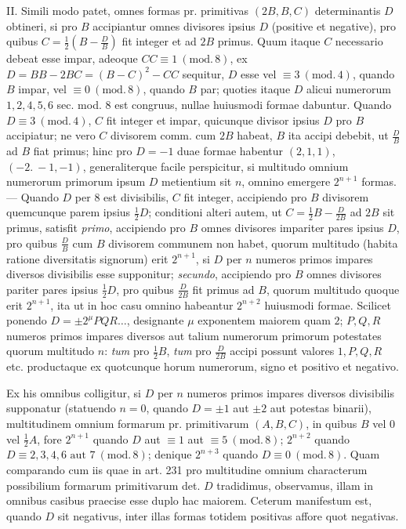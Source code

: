 II. Simili modo patet, omnes formas pr. primitivas \((2B,B,C)\) determinantis \(D\) obtineri, si pro \(B\) accipiantur omnes divisores ipsius \(D\) (positive et negative), pro quibus \(C=\frac12(B-\frac{D}{B})\) fit integer et ad \(2B\) primus. Quum itaque \(C\) necessario debeat esse impar, adeoque \(CC\equiv1\ (\mathrm{mod.}\,8)\), ex \(D=BB-2BC=(B-C)^2-CC\) sequitur, \(D\) esse vel \(\equiv3\ (\mathrm{mod.}\,4)\), quando \(B\) impar, vel \(\equiv0\ (\mathrm{mod.}\,8)\), quando \(B\) par; quoties itaque \(D\) alicui numerorum \(1,2,4,5,6\) sec. mod. \(8\) est congruus, nullae huiusmodi formae dabuntur. Quando \(D\equiv3\ (\mathrm{mod.}\,4)\), \(C\) fit integer et impar, quicunque divisor ipsius \(D\) pro \(B\) accipiatur; ne vero \(C\) divisorem comm. cum \(2B\) habeat, \(B\) ita accipi debebit, ut \(\frac{D}{B}\) ad \(B\) fiat primus; hinc pro \(D=-1\) duae formae habentur \((2,1,1)\), \((-2.\ -1,-1)\), generaliterque facile perspicitur, si multitudo omnium numerorum primorum ipsum \(D\) metientium sit \(n\), omnino emergere \(2^{n+1}\) formas. --- Quando \(D\) per \(8\) est divisibilis, \(C\) fit integer, accipiendo pro \(B\) divisorem quemcunque parem ipsius \(\frac12 D\); conditioni alteri autem, ut \(C=\frac12 B-\frac{D}{2B}\) ad \(2B\) sit primus, satisfit \textit{primo}, accipiendo pro \(B\) omnes divisores impariter pares ipsius \(D\), pro quibus \(\frac{D}{B}\) cum \(B\) divisorem communem non habet, quorum multitudo (habita ratione diversitatis signorum) erit \(2^{n+1}\), si \(D\) per \(n\) numeros primos impares diversos divisibilis esse supponitur; \textit{secundo}, accipiendo pro \(B\) omnes divisores pariter pares ipsius
\(\frac12 D\), pro quibus \(\frac{D}{2B}\) fit primus ad \(B\), quorum multitudo quoque erit \(2^{n+1}\), ita ut in hoc casu omnino habeantur \(2^{n+2}\) huiusmodi formae. Scilicet ponendo \(D=\pm2^\mu PQR\ldots\), designante \(\mu\) exponentem maiorem quam \(2\); \(P,Q,R\) numeros primos impares diversos aut talium numerorum primorum potestates quorum multitudo \(n\): \textit{tum} pro \(\frac12 B\), \textit{tum} pro \(\frac{D}{2B}\) accipi possunt valores \(1,P,Q,R\) etc. productaque ex quotcunque horum numerorum, signo et positivo et negativo.

Ex his omnibus colligitur, si \(D\) per \(n\) numeros primos impares diversos divisibilis supponatur (statuendo \(n=0\), quando \(D=\pm1\) aut \(\pm2\) aut potestas binarii), multitudinem omnium formarum pr. primitivarum \((A,B,C)\), in quibus \(B\) vel \(0\) vel \(\frac12 A\), fore \(2^{n+1}\) quando \(D\) aut \(\equiv1\) aut \(\equiv5\ (\mathrm{mod.}\,8)\); \(2^{n+2}\) quando \(D\equiv2,3,4,6\text{ aut }7\ (\mathrm{mod.}\,8)\); denique \(2^{n+3}\) quando \(D\equiv0\ (\mathrm{mod.}\,8)\). Quam comparando cum iis quae in art. 231 pro multitudine omnium characterum possibilium formarum primitivarum det. \(D\) tradidimus, observamus, illam in omnibus casibus praecise esse duplo hac maiorem. Ceterum manifestum est, quando \(D\) sit negativus, inter illas formas totidem positivas affore quot negativas.

